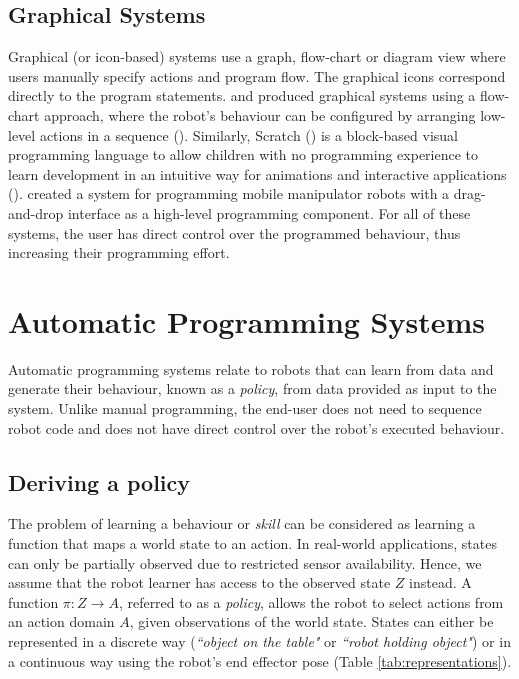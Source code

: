 \subsection{Graphical Systems}\label{sssec:Graphical systems}
Graphical (or icon-based) systems use a graph, flow-chart or diagram view where users manually specify actions and program flow.
The graphical icons correspond directly to the program statements.
\cite{lego2003} and \cite{bischoff2002morpha} produced graphical systems using a flow-chart approach, where the robot's behaviour can be configured by arranging low-level actions in a sequence ().
Similarly, Scratch (\cite{majed2014learn}) is a block-based visual programming language to allow children with no programming experience to learn development in an intuitive way for animations and interactive applications ().
\cite{huang2017code3} created a system for programming mobile manipulator robots with a drag-and-drop interface as a high-level programming component.
For all of these systems, the user has direct control over the programmed behaviour, thus increasing their programming effort.

\section{Automatic Programming Systems}\label{subsec:Automatic Programming Systems}
Automatic programming systems relate to robots that can learn from data and generate their behaviour, known as a \textit{policy}, from data provided as input to the system.
Unlike manual programming, the end-user does not need to sequence robot code and does not have direct control over the robot's executed behaviour.

\subsection{Deriving a policy}\label{subsec:Deriving a policy}
The problem of learning a behaviour or \textit{skill} can be considered as learning a function that maps a world state to an action.
In real-world applications, states can only be partially observed due to restricted sensor availability.
Hence, we assume that the robot learner has access to the observed state $Z$ instead.
A function $\pi : Z \rightarrow A$, referred to as a \textit{policy}, allows the robot to select actions from an action domain $A$, given observations of the world state.
States can either be represented in a discrete way (\textit{``object on the table"} or \textit{``robot holding object"}) or in a continuous way \eg using the robot's end effector pose (Table \ref{tab:representations}).

